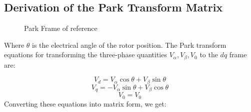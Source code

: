 \subsection{Derivation of the Park Transform Matrix}

\begin{figure}[ht]
    \centering
    \caption{Park Frame of reference}
    \label{Park Frame of reference}
\end{figure}

\noindent
Where \( \theta \) is the electrical angle of the rotor position.
\noindent
The Park transform equations for transforming the three-phase quantities \(
V_\alpha, V_\beta, V_0 \) to the \( dq \) frame are:

\begin{equation*}
    V_d = V_\alpha \cos \theta + V_\beta \sin \theta
\end{equation*}
\begin{equation*}
    V_q = -V_\alpha \sin \theta + V_\beta \cos \theta
\end{equation*}
\begin{equation*}
    V_0 = V_0
\end{equation*}
\noindent
Converting these equations into matrix form, we get:

